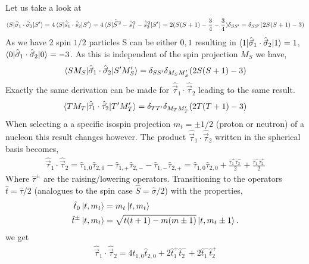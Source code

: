 \documentclass[10pt]{article}
\begin{document}
Let us take a look at
\begin{align*}
	\braket{ S | \hat{ \vec{\sigma}}_{1} \cdot \hat{ \vec{\sigma}}_{2} | S'} = 4 \braket{ S | \hat{ \vec{s}}_{1} \cdot \hat{ \vec{s}}_{2} | S'} = 4 \braket{ S | \hat{\vec{S}}^{\, 2} - \hat{\vec{s}}_{1}^{\,2} - \hat{\vec{s}}_{2}^{\,2} | S'} = 2 ( S(S+1) - \frac{3}{4} - \frac{3}{4} ) \delta_{SS'} = \delta_{SS'} (2 S(S+1) - 3)
\end{align*}
As we have 2 spin $1/2$ particles S can be either $0,1$ resulting in $\braket{ 1 | \hat{ \vec{\sigma}}_{1} \cdot \hat{ \vec{\sigma}}_{2} | 1} = 1$, $\braket{ 0 | \hat{ \vec{\sigma}}_{1} \cdot \hat{ \vec{\sigma}}_{2} | 0} = -3$.
 As this is independent of the spin projection $M_S$ we have,
\begin{align*}
	\braket{ S M_S | \hat{ \vec{\sigma}}_{1} \cdot \hat{ \vec{\sigma}}_{2} | S' M_S'} = \delta_{SS'} \delta_{M_S M_S'} (2 S(S+1) - 3)
\end{align*}
Exactly the same derivation can be made for $\hat{\vec{\tau}}_{1} \cdot \hat{\vec{\tau}}_{2}$ leading to the same result.
\begin{align*}
	\braket{ T M_T | \hat{\vec{\tau}}_{1} \cdot \hat{\vec{\tau}}_{2} | T' M_T'} = \delta_{TT'} \delta_{M_T M_T'} (2 T(T+1) - 3)
\end{align*}
When selecting a a specific isospin projection $m_t = \pm 1/2 $ (proton or neutron) of a nucleon this result changes however.
The product $\hat{\vec{\tau}}_{1} \cdot \hat{\vec{\tau}}_{2}$ written in the spherical basis becomes,
\begin{align*}
	\hat{\vec{\tau}}_{1} \cdot \hat{\vec{\tau}}_{2} = \hat{\tau}_{1,0} \hat{\tau}_{2,0} - \hat{\tau}_{1,+} \hat{\tau}_{2,-} - \hat{\tau}_{1,-} \hat{\tau}_{2,+} = \hat{\tau}_{1,0} \hat{\tau}_{2,0} + \frac{\hat{\tau}_{1}^{+} \hat{\tau}_{2}^{-}}{2} + \frac{ \hat{\tau}_{1}^{-} \hat{\tau}_{2}^{+}}{2}
\end{align*}
Where $\hat{\tau}^{\pm}$ are the raising/lowering operators. Transitioning to the operators $\hat{t} = \hat{\tau}/2$ (analogues to the spin case $\hat{S} = \hat{\sigma}/2$) with the properties,
\begin{align*}
\hat{t}_0 \ket{ t, m_t} &= m_t \ket{ t, m_t} \\
\hat{t}^{\pm} \ket{ t, m_t} &= \sqrt{ t(t+1) - m(m \pm 1)} \ket { t, m_t \pm 1}.
\end{align*}
we get
\begin{align*}
	\hat{\vec{\tau}}_{1} \cdot \hat{\vec{\tau}}_{2} = 4 \hat{t}_{1,0} \hat{t}_{2,0} + 2 \hat{t}_{1}^{+} \hat{t}_{2}^{-} + 2 \hat{t}_{1}^{-} \hat{t}_{2}^{+} 
\end{align*}
\end{document}
